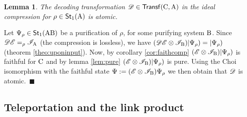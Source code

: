 \documentclass[12pt,aps,pra,showpacs,groupedaddress]{revtex4-1}
\newtheorem{lemma}{Lemma} \newtheorem{proposition}{Proposition}
\newtheorem{corollary}{Corollary} \newtheorem{theorem}{Theorem}
\def\Proof{\medskip\par\noindent{\bf Proof. }}
\def\qed{$\,\blacksquare$\par}
\def\rB{{\rm B}}
\def\rC{{\rm C}}
\def\Cntset{{\mathsf{Eff}}}
\def\Stset{{\mathsf{St}}}
\def\Trnset{{\mathsf{Transf}}}
\begin{document}
\begin{lemma}
  The decoding transformation $\tD \in \Trnset(\rC, \rA)$ in the ideal compression for $\rho\in\Stset_1(\rA)$ is atomic.
  \label{lem:atomicdec}
\end{lemma}

\Proof Let $\Psi_\rho  \in\Stset_1 (\rA\rB)$ be a purification of $\rho$, for some purifying system $\rB$.  Since $\mathscr D\mathscr E =_\rho \mathscr I_{\rm A}$ (the compression is lossless), we have
$(\tD\tE\otimes\tI_{\rB})|\Psi_\rho)=|\Psi_\rho)$ (theorem \ref{theo:uponinput}).  Now, by corollary
\ref{cor:faithcomp} $(\tE\otimes\tI_\rB)|\Psi_\rho)$ is faithful for $\rC$ and by lemma \ref{lem:pure} $(\tE\otimes\tI_\rB)|\Psi_\rho)$ is pure. Using the Choi  isomorphism with the faithful state $\Psi: = (\tE\otimes\tI_\rB)\Psi_\rho $ we then obtain
that $\mathscr D$ is atomic. \qed







\subsection{Teleportation and the link product}
\end{document}
